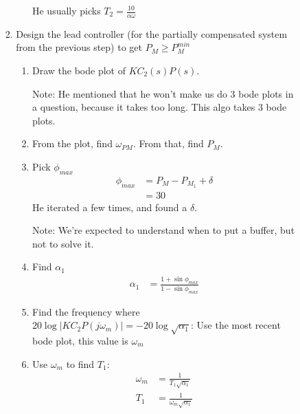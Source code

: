 \begin{enumerate}
\begin{enumerate}
\begin{itemize}
\begin{enumerate}
\begin{enumerate}
                                        He usually picks $T_2 = \frac{10}{\alpha \omega}$
                                \end{enumerate}
                            \item Design the lead controller (for the partially compensated system from the previous step) to get $P_M \ge P_M^{min}$
                                \begin{enumerate}
                                    \item Draw the bode plot of $KC_2(s)P(s)$.

                                        Note: He mentioned that he won't make us do 3 bode plots in a question, because it takes too long. This algo takes 3 bode plots.

                                    \item From the plot, find $\omega_{PM}$. From that, find $P_M$.

                                    \item Pick $\phi_{max}$
                                        \begin{align*}
                                            \phi_{max} &= P_M - P_{M_1} + \delta \\
                                            &= 30
                                        \end{align*}
                                        He iterated a few times, and found a $\delta$.

                                        Note: We're expected to understand when to put a buffer, but not to solve it.
                                    \item Find $\alpha_1$
                                        \begin{align*}
                                            \alpha_1 &= \frac{1 + \sin \phi_{max}}{1 - \sin \phi_{max}}
                                        \end{align*}
                                    \item Find the frequency where $20 \log|K C_2 P(j\omega_m)| = -20 \log\sqrt{\alpha_1}$:
                                        Use the most recent bode plot, this value is $\omega_m$

                                    \item Use $\omega_m$ to find $T_1$:
                                        \begin{align*}
                                            \omega_m &= \frac{1}{T_1 \sqrt{\alpha_1}} \\
                                            T_1 &= \frac{1}{\omega_m \sqrt{\alpha_1}}
                                        \end{align*}


\end{enumerate}
\end{enumerate}
\end{itemize}
\end{enumerate}
\end{enumerate}
